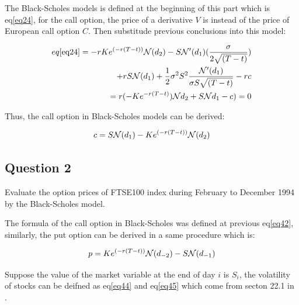 \documentclass[sigconf]{acmart}
\begin{document}
\begin{itemize}
The Black-Scholes models is defined at the beginning of this part which is eq\eqref{eq24}, for the call option, the price of a derivative $V$ is instead of the price of European call option $C$. Then substitude previous conclusions into this model:

\begin{equation} \label{eq41}
\setlength{\abovedisplayskip}{3pt}
\setlength{\belowdisplayskip}{9pt}
\begin{split}
eq\eqref{eq24} = - rKe^{(-r(T-t))} \mathcal{N}(d_{2}) - S\mathcal{N'}(d_{1})(\frac{\sigma}{2 \sqrt{(T-t)}}) \\
 + rS\mathcal{N}(d_{1}) + \frac{1}{2}\sigma^{2}S^{2} \frac{\mathcal{N'}(d_{1})}{\sigma S \sqrt{(T-t)}} -rc \\
= r(-Ke^{-r(T-t)})\mathcal{N}{d_{2}} + S\mathcal{N}{d_{1}}-c)=0
\end{split}
\end{equation}

Thus, the call option in Black-Scholes models can be derived:

\begin{equation} \label{eq42}
\setlength{\abovedisplayskip}{3pt}
\setlength{\belowdisplayskip}{9pt}
c = S\mathcal{N}{(d_{1})} - Ke^{(-r(T-t))} \mathcal{N}(d_{2})
\end{equation}

\end{itemize}


\subsection{Question 2}


Evaluate the option prices of FTSE100 index during February to December 1994 by the Black-Scholes model.

The formula of the call option in Black-Scholes was defined at previous eq\eqref{eq42}, similarly, the put option can be derived in a same procedure which is:

\begin{equation} \label{eq43}
\setlength{\abovedisplayskip}{3pt}
\setlength{\belowdisplayskip}{9pt}
p = Ke^{(-r(T-t))} \mathcal{N}(d_{-2}) - S\mathcal{N}{(d_{-1})}
\end{equation}

Suppose the value of the market variable at the end of day $i$ is $S_{i}$, the volatility of stocks can be deifned as eq\eqref{eq44} and eq\eqref{eq45} which come from secton 22.1 in \cite{hull2016options}.
\end{document}
